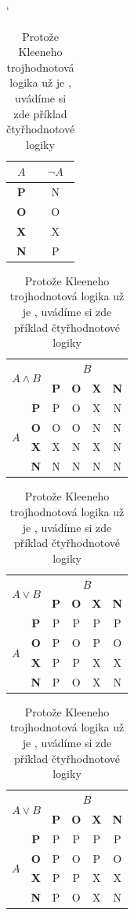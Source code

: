 \documentclass[a4paper, 11pt]{article}
\begin{document}
\begin{table}[h]
\catcode`
\centering
\begin{tabular}{|c|c|}
    \hline
    $A$ & $\neg A$ \\
    \hline
    \textbf{P} & N \\
    \hline
    \textbf{O} & O \\
    \hline
    \textbf{X} & X \\
    \hline
    \textbf{N} & P \\
    \hline
\end{tabular}
\begin{tabular}{|c|c|c|c|c|c|}
    \hline
    \multicolumn{2}{|c|}{\multirow{2}{*}{$A \wedge B$}} & \multicolumn{4}{|c|}{$B$} \\
    \cline{3-6}
    \multicolumn{2}{|c|}{} & \textbf{P} & \textbf{O} & \textbf{X} & \textbf{N} \\
    \hline
    \multirow{4}{*}{$A$} & \textbf{P} & P & O & X & N \\
    \cline{2-6}
    & \textbf{O} & O & O & N & N \\
    \cline{2-6}
    & \textbf{X} & X & N & X & N \\
    \cline{2-6}
    & \textbf{N} & N & N & N & N \\
    \hline
\end{tabular}
\begin{tabular}{|c|c|c|c|c|c|}
    \hline
    \multicolumn{2}{|c|}{\multirow{2}{*}{$A \vee B$}} & \multicolumn{4}{|c|}{$B$} \\
    \cline{3-6}
    \multicolumn{2}{|c|}{} & \textbf{P} & \textbf{O} & \textbf{X} & \textbf{N} \\
    \hline
    \multirow{4}{*}{$A$} & \textbf{P} & P & P & P & P \\
    \cline{2-6}
    & \textbf{O} & P & O & P & O \\
    \cline{2-6}
    & \textbf{X} & P & P & X & X \\
    \cline{2-6}
    & \textbf{N} & P & O & X & N \\
    \hline
\end{tabular}
\begin{tabular}{|c|c|c|c|c|c|}
    \hline
    \multicolumn{2}{|c|}{\multirow{2}{*}{$A \vee B$}} & \multicolumn{4}{|c|}{$B$} \\
    \cline{3-6}
    \multicolumn{2}{|c|}{} & \textbf{P} & \textbf{O} & \textbf{X} & \textbf{N} \\
    \hline
    \multirow{4}{*}{$A$} & \textbf{P} & P & P & P & P \\
    \cline{2-6}
    & \textbf{O} & P & O & P & O \\
    \cline{2-6}
    & \textbf{X} & P & P & X & X \\
    \cline{2-6}
    & \textbf{N} & P & O & X & N \\
    \hline
\end{tabular}
\caption{Protože Kleeneho trojhodnotová logika už je , uvádíme si zde příklad čtyřhodnotové logiky}
\label{tabulka_2}
\end{table}
\bigskip
\end{document}
